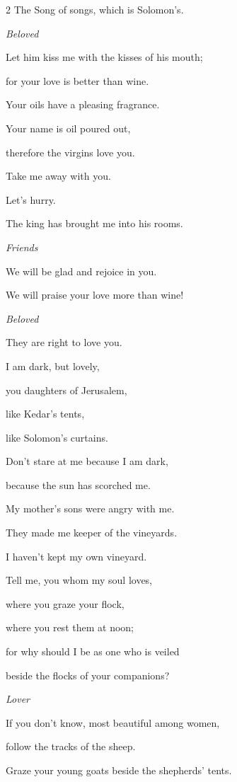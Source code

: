 \begin{multicols}{2}
\mychapter{} \myverse*{}The Song of songs, which is Solomon’s.


\textit{Beloved}

\myverse{}Let him kiss me with the kisses of his mouth;

for your love is better than wine.

\myverse{}Your oils have a pleasing fragrance.

Your name is oil poured out,

therefore the virgins love you.

\myverse{}Take me away with you.

Let’s hurry.

The king has brought me into his rooms.

\textit{Friends}

We will be glad and rejoice in you.

We will praise your love more than wine!

\textit{Beloved}

They are right to love you.

\myverse{}I am dark, but lovely,

you daughters of Jerusalem,

like Kedar’s tents,

like Solomon’s curtains.

\myverse{}Don’t stare at me because I am dark,

because the sun has scorched me.

My mother’s sons were angry with me.

They made me keeper of the vineyards.

I haven’t kept my own vineyard.

\myverse{}Tell me, you whom my soul loves,

where you graze your flock,

where you rest them at noon;

for why should I be as one who is veiled

beside the flocks of your companions?


\textit{Lover}

\myverse{}If you don’t know, most beautiful among women,

follow the tracks of the sheep.

Graze your young goats beside the shepherds’ tents.

\vspace{\baselineskip}


\end{multicols}
